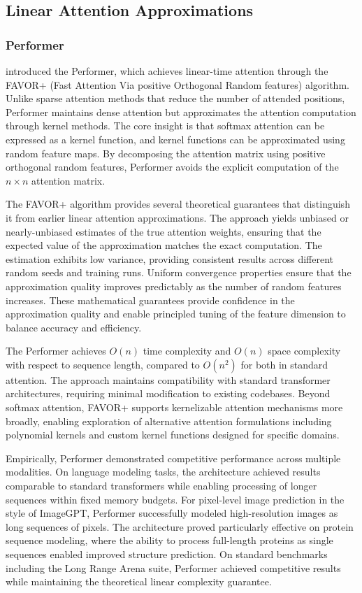 \subsection{Linear Attention Approximations}

\subsubsection{Performer}

\citet{choromanski2021rethinking} introduced the Performer, which achieves linear-time attention through the FAVOR+ (Fast Attention Via positive Orthogonal Random features) algorithm. Unlike sparse attention methods that reduce the number of attended positions, Performer maintains dense attention but approximates the attention computation through kernel methods. The core insight is that softmax attention can be expressed as a kernel function, and kernel functions can be approximated using random feature maps. By decomposing the attention matrix using positive orthogonal random features, Performer avoids the explicit computation of the $n \times n$ attention matrix.

The FAVOR+ algorithm provides several theoretical guarantees that distinguish it from earlier linear attention approximations. The approach yields unbiased or nearly-unbiased estimates of the true attention weights, ensuring that the expected value of the approximation matches the exact computation. The estimation exhibits low variance, providing consistent results across different random seeds and training runs. Uniform convergence properties ensure that the approximation quality improves predictably as the number of random features increases. These mathematical guarantees provide confidence in the approximation quality and enable principled tuning of the feature dimension to balance accuracy and efficiency.

The Performer achieves $O(n)$ time complexity and $O(n)$ space complexity with respect to sequence length, compared to $O(n^2)$ for both in standard attention. The approach maintains compatibility with standard transformer architectures, requiring minimal modification to existing codebases. Beyond softmax attention, FAVOR+ supports kernelizable attention mechanisms more broadly, enabling exploration of alternative attention formulations including polynomial kernels and custom kernel functions designed for specific domains.

Empirically, Performer demonstrated competitive performance across multiple modalities. On language modeling tasks, the architecture achieved results comparable to standard transformers while enabling processing of longer sequences within fixed memory budgets. For pixel-level image prediction in the style of ImageGPT, Performer successfully modeled high-resolution images as long sequences of pixels. The architecture proved particularly effective on protein sequence modeling, where the ability to process full-length proteins as single sequences enabled improved structure prediction. On standard benchmarks including the Long Range Arena suite, Performer achieved competitive results while maintaining the theoretical linear complexity guarantee.

